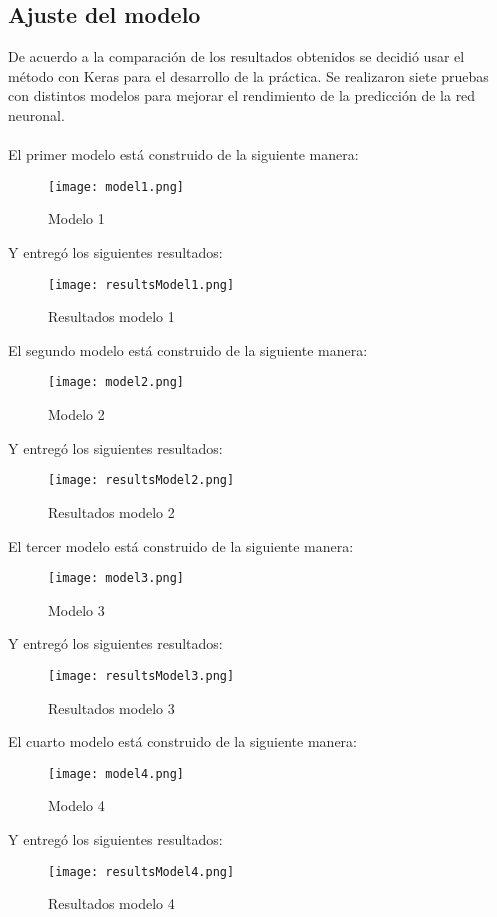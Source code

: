 \documentclass[journal]{IEEEtran}
\begin{document}
\subsection{Ajuste del modelo}
De acuerdo a la comparación de los resultados obtenidos se decidió usar el método con Keras para el desarrollo de la práctica. Se realizaron siete pruebas con distintos modelos para mejorar el rendimiento de la predicción de la red neuronal.\\
\\
El primer modelo está construido de la siguiente manera:
\begin{figure} [H]
    \centering
    \texttt{[image: model1.png]}
    \caption{Modelo 1}
    \label{9}
\end{figure}
Y entregó los siguientes resultados:
\begin{figure} [H]
    \centering
    \texttt{[image: resultsModel1.png]}
    \caption{Resultados modelo 1}
    \label{10}
\end{figure}
El segundo modelo está construido de la siguiente manera:
\begin{figure} [H]
    \centering
    \texttt{[image: model2.png]}
    \caption{Modelo 2}
    \label{11}
\end{figure}
Y entregó los siguientes resultados:
\begin{figure} [H]
    \centering
    \texttt{[image: resultsModel2.png]}
    \caption{Resultados modelo 2}
    \label{12}
\end{figure}
El tercer modelo está construido de la siguiente manera:
\begin{figure} [H]
    \centering
    \texttt{[image: model3.png]}
    \caption{Modelo 3}
    \label{13}
\end{figure}
Y entregó los siguientes resultados:
\begin{figure} [H]
    \centering
    \texttt{[image: resultsModel3.png]}
    \caption{Resultados modelo 3}
    \label{14}
\end{figure}
El cuarto modelo está construido de la siguiente manera:
\begin{figure} [H]
    \centering
    \texttt{[image: model4.png]}
    \caption{Modelo 4}
    \label{15}
\end{figure}
Y entregó los siguientes resultados:
\begin{figure} [H]
    \centering
    \texttt{[image: resultsModel4.png]}
    \caption{Resultados modelo 4}
    \label{16}
\end{figure}
\end{document}
